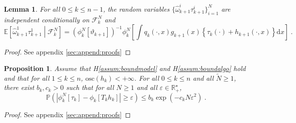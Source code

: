 \documentclass[12pt]{article}
\newcommand{\rmd}{\mathrm{d}}
\newcommand{\eqsp}{\;}
\newcommand{\1}{\mathrm{1}}
\newtheorem{lemma}{Lemma}
\newtheorem{proposition}{Proposition}
\begin{document}
\begin{lemma}
\label{lem:iid}
For all $0\le k \le n-1$, the random variables $\{\widehat{\omega}_{k+1}^i\tau_{k+1}^i\}_{i=1}^N$ are independent conditionally on $\mathcal{F}_k^{N}$ and%
\[
\mathbb{E}\left[\widehat{\omega}^1_{k+1}\tau^{1}_{k+1}\middle| \mathcal{F}_k^{N}\right] = \left(\phi^N_{k}[\vartheta_{k+1}]\right)^{-1}\phi^N_{k}\left[\int q_{k}(\cdot,x)g_{k+1}(x)\left\{\tau_k(\cdot) + h_{k+1}(\cdot,x)\right\}\rmd x\right]\eqsp.
\]
\end{lemma}

\begin{proof}
See appendix \ref{sec:append:proofs}
\end{proof}

\begin{proposition}
\label{prop:exp:deviation}
Assume that H\ref{assum:boundmodel} and H\ref{assum:boundalgo} hold and that for all $1\le k\le n$, $\mathrm{osc}(h_k)<+\infty$. For all $0\le k\le n$ and all $\widetilde{N}\ge 1$, there exist $b_k,c_k>0$ such that for all $N\ge 1$ and all $\varepsilon\in\mathbb{R}_+^\star$,
\[
\mathbb{P}\left(\left|\phi_k^N[\tau_k] - \phi_k\left[T_kh_k\right]\right|\ge \varepsilon\right)\le b_k\exp\left(-c_kN\varepsilon^2\right)\eqsp.
\]
\end{proposition}

\begin{proof}
See appendix \ref{sec:append:proofs}
\end{proof}
\end{document}
